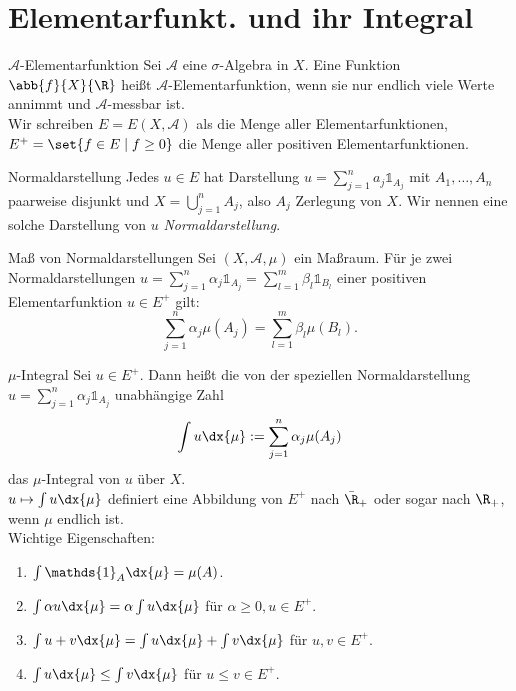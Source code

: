 \section*{Elementarfunkt. und ihr Integral}

\begin{karte}{\( \mathcal{A} \)-Elementarfunktion}
	Sei \( \mathcal{A} \) eine \(\sigma\)-Algebra in \(X\). 
	Eine Funktion \( \abb{f}{X}{\R} \) heißt \(\mathcal{A}\)-Elementarfunktion, 
	wenn sie nur endlich viele Werte annimmt und \(\mathcal{A}\)-messbar ist.\\
	Wir schreiben \( E = E(X, \mathcal{A}) \) als die Menge aller Elementarfunktionen, 
	\( E^+ = \set{ f\in E \;|\; f \geq 0 } \) die Menge aller positiven Elementarfunktionen.
\end{karte}

\begin{karte}{Normaldarstellung}
	Jedes \( u \in E \) hat Darstellung \( u = \sum_{j=1}^n a_j \mathds{1}_{A_j} \) 
	mit \( A_1,\ldots, A_n \) paarweise disjunkt und \( X = \bigcup_{j=1}^n A_j \), also \( A_j \) Zerlegung von \(X\).
	Wir nennen eine solche Darstellung von \(u\) \textit{Normaldarstellung}.
\end{karte}

\begin{karte}{Maß von Normaldarstellungen}
	Sei \( (X, \mathcal{A}, \mu) \) ein Maßraum. Für je zwei Normaldarstellungen 
	\( u = \sum_{j=1}^n \alpha_j \mathds{1}_{A_j} = \sum_{l=1}^m \beta_l \mathds{1}_{B_l} \) einer 
	positiven Elementarfunktion \( u \in E^+ \) gilt: 
	\[ \sum_{j=1}^n \alpha_j \mu(A_j) 
	= \sum_{l=1}^m \beta_l \mu(B_l). \]
\end{karte}

\begin{karte}{\( \mu \)-Integral}
	Sei \( u \in E^+ \). Dann heißt die von der speziellen Normaldarstellung 
	\( u = \sum_{j=1}^n \alpha_j \mathds{1}_{A_j} \) unabhängige 
	Zahl 
	\[ \int u \dx{\mu} 
	:= \sum_{j=1}^n \alpha_j \mu(A_j) \]
	das \( \mu \)-Integral von \(u\) über \(X\).\\
	\( u \mapsto \int u \dx{\mu} \) definiert eine Abbildung von 
	\(E^+\) nach \( \bar{\R}_+ \) oder sogar nach \( \R_+ \), wenn \(\mu\) 
	endlich ist.\\
	Wichtige Eigenschaften:
	\begin{enumerate}
		\item \( \int \mathds{1}_A \dx{\mu} = \mu(A) \).
		\item \( \int \alpha u \dx{\mu} = \alpha \int u \dx{\mu} \) für \( \alpha \geq 0, u \in E^+ \).
		\item \( \int u + v \dx{\mu} = \int u \dx{\mu} + \int v \dx{\mu} \) für \( u,v \in E^+ \).
		\item \( \int u \dx{\mu} \leq \int v \dx{\mu} \) für \( u \leq v \in E^+ \).
	\end{enumerate}
\end{karte}